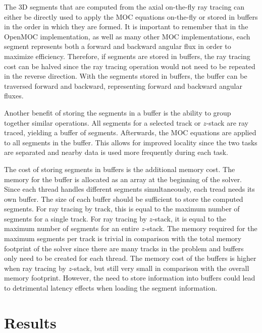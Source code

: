 The 3D segments that are computed from the axial on-the-fly ray tracing can either be directly used to apply the \ac{MOC} equations on-the-fly or stored in buffers in the order in which they are formed. It is important to remember that in the OpenMOC implementation, as well as many other \ac{MOC} implementations, each segment represents both a forward and backward angular flux in order to maximize efficiency. Therefore, if segments are stored in buffers, the ray tracing cost can be halved since the ray tracing operation would not need to be repeated in the reverse direction. With the segments stored in buffers, the buffer can be traversed forward and backward, representing forward and backward angular fluxes.

Another benefit of storing the segments in a buffer is the ability to group together similar operations. All segments for a selected track or $z$-stack are ray traced, yielding a buffer of segments. Afterwards, the \ac{MOC} equations are applied to all segments in the buffer. This allows for improved locality since the two tasks are separated and nearby data is used more frequently during each task.

The cost of storing segments in buffers is the additional memory cost. The memory for the buffer is allocated as an array at the beginning of the solver. Since each thread handles different segments simultaneously, each tread needs its own buffer. The size of each buffer should be sufficient to store the computed segments. For ray tracing by track, this is equal to the maximum number of segments for a single track. For ray tracing by $z$-stack, it is equal to the maximum number of segments for an entire $z$-stack. The memory required for the maximum segments per track is trivial in comparison with the total memory footprint of the solver since there are many tracks in the problem and buffers only need to be created for each thread. The memory cost of the buffers is higher when ray tracing by $z$-stack, but still very small in comparison with the overall memory footprint. However, the need to store information into buffers could lead to detrimental latency effects when loading the segment information.

\section{Results}
\label{sec:rt-results}


